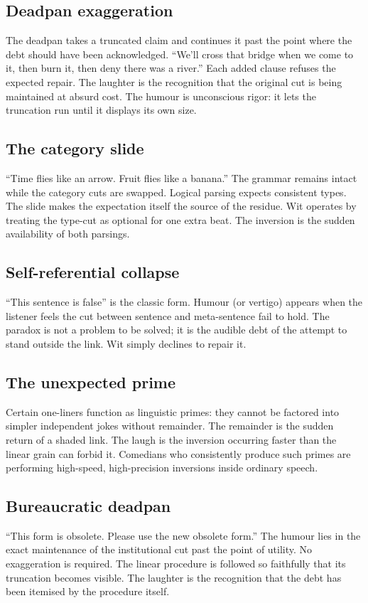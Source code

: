 \documentclass[11pt,a4paper]{article}
\begin{document}
\subsection{Deadpan exaggeration} The deadpan takes a truncated claim and continues it past the point where the debt should have been acknowledged. ``We’ll cross that bridge when we come to it, then burn it, then deny there was a river.'' Each added clause refuses the expected repair. The laughter is the recognition that the original cut is being maintained at absurd cost. The humour is unconscious rigor: it lets the truncation run until it displays its own size.

\subsection{The category slide} ``Time flies like an arrow. Fruit flies like a banana.'' The grammar remains intact while the category cuts are swapped. Logical parsing expects consistent types. The slide makes the expectation itself the source of the residue. Wit operates by treating the type-cut as optional for one extra beat. The inversion is the sudden availability of both parsings.

\subsection{Self-referential collapse} ``This sentence is false'' is the classic form. Humour (or vertigo) appears when the listener feels the cut between sentence and meta-sentence fail to hold. The paradox is not a problem to be solved; it is the audible debt of the attempt to stand outside the link. Wit simply declines to repair it.

\subsection{The unexpected prime} Certain one-liners function as linguistic primes: they cannot be factored into simpler independent jokes without remainder. The remainder is the sudden return of a shaded link. The laugh is the inversion occurring faster than the linear grain can forbid it. Comedians who consistently produce such primes are performing high-speed, high-precision inversions inside ordinary speech.

\subsection{Bureaucratic deadpan} ``This form is obsolete. Please use the new obsolete form.'' The humour lies in the exact maintenance of the institutional cut past the point of utility. No exaggeration is required. The linear procedure is followed so faithfully that its truncation becomes visible. The laughter is the recognition that the debt has been itemised by the procedure itself.
\end{document}
